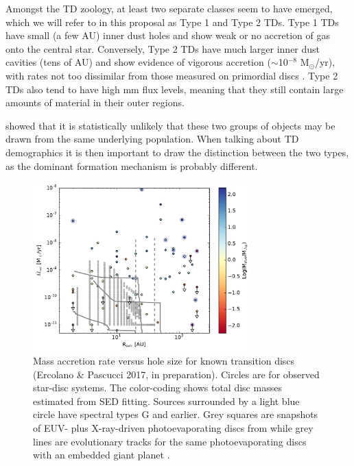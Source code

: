 \documentclass[10pt,fleqn,twoside]{article}
\begin{document}
\begin{highlight}
Amongst the TD zoology, at least two separate classes seem
to have emerged, which we will refer to in this proposal as Type 1 and
Type 2 TDs. Type 1 TDs have small (a few AU) inner dust holes and show weak or no accretion of
gas onto the central star. Conversely, Type
2 TDs have much larger inner dust cavities (tens of AU) and show evidence of vigorous accretion ($\sim$10$^{-8}$
M$_{\odot}$/yr), with rates not too dissimilar from those measured
on primordial discs \citep[e.g.,][]{2014A&A...568A..18M}.
Type 2 TDs also tend to have high mm flux levels, meaning that
they still contain large amounts of material in their outer
regions. 
\end{highlight}
\citet{2012MNRAS.426L..96O} showed that it is statistically
unlikely that these two groups of objects may be drawn from the same
underlying population. When talking about TD demographics it is then
important to draw the distinction between the two types, as the
dominant formation mechanism is probably different. 

\begin{figure}
\centerline{\includegraphics[width=0.75\textwidth]{figures/Macc_Rhole_Mdisk.pdf}}
\caption{\label{fig-macc-rhole-mdisc}
  Mass accretion rate versus hole size for known transition
  discs (Ercolano \& Pascucci 2017, in preparation). Circles are for
  observed star-disc systems. The color-coding shows total disc masses
  estimated from SED fitting. Sources surrounded by a
  light blue circle have spectral types G and earlier. Grey squares
  are snapshots of EUV- plus X-ray-driven photoevaporating discs from
  \citet{2011MNRAS.412...13O} while grey lines are evolutionary tracks for the
  same photoevaporating discs with an embedded giant planet 
  \citep{2013MNRAS.430.1392R}.} 
\end{figure}
\end{document}

